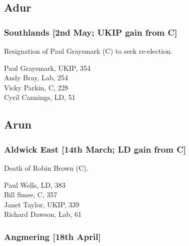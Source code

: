 \documentclass[a4paper,openany,10pt]{book}
\begin{document}
\subsection*{Adur}

\subsubsection*{Southlands \hspace*{\fill}\nolinebreak[1]%
\enspace\hspace*{\fill}
[2nd May; UKIP gain from C]}


Resignation of Paul Graysmark (C) to seek re-election.



Paul Graysmark, UKIP, 354\\
Andy Bray, Lab, 254\\
Vicky Parkin, C, 228\\
Cyril Cannings, LD, 51\\


\subsection*{Arun}

\subsubsection*{Aldwick East \hspace*{\fill}\nolinebreak[1]%
\enspace\hspace*{\fill}
[14th March; LD gain from C]}


Death of Robin Brown (C).



Paul Wells, LD, 383\\
Bill Smee, C, 357\\
Janet Taylor, UKIP, 339\\
Richard Dawson, Lab, 61\\


\subsubsection*{Angmering \hspace*{\fill}\nolinebreak[1]%
\enspace\hspace*{\fill}
[18th April]}
\end{document}
